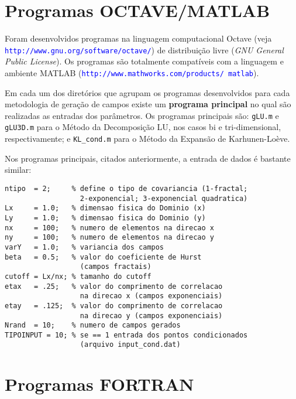 \documentclass[12pt,a4paper,portuges]{article}
\newcommand{\KL}{{Karhunen-Lo\`eve}}
\begin{document}
\section{Programas OCTAVE/MATLAB}

Foram desenvolvidos programas na linguagem computacional Octave (veja
\textcolor{blue}{\texttt{http://www.gnu.org/software/octave/}}) de distribuição livre ({\em GNU
General Public License}). Os programas são totalmente compatíveis com a linguagem e ambiente 
MATLAB (\textcolor{blue}{\texttt{http://www.mathworks.com/products/ matlab}}).%

Em cada um dos diretórios que agrupam os programas desenvolvidos para cada metodologia de geração
de campos existe um {\bf programa principal} no qual são realizadas as entradas dos parâmetros. Os
programas principais são: \texttt{gLU.m} e \texttt{gLU3D.m} para o Método da Decomposição LU, nos
casos bi e tri-dimensional, respectivamente; e \texttt{KL\_cond.m} para o Método da Expansão de
\KL. 

Nos programas principais, citados anteriormente, a entrada de dados é bastante similar:

\begin{verbatim}
ntipo  = 2;     % define o tipo de covariancia (1-fractal;
                  2-exponencial; 3-exponencial quadratica)
Lx     = 1.0;   % dimensao fisica do Dominio (x)
Ly     = 1.0;   % dimensao fisica do Dominio (y)
nx     = 100;   % numero de elementos na direcao x
ny     = 100;   % numero de elementos na direcao y
varY   = 1.0;   % variancia dos campos
beta   = 0.5;   % valor do coeficiente de Hurst
                  (campos fractais)
cutoff = Lx/nx; % tamanho do cutoff
etax   = .25;   % valor do comprimento de correlacao
                  na direcao x (campos exponenciais)
etay   = .125;  % valor do comprimento de correlacao
                  na direcao y (campos exponenciais)
Nrand  = 10;    % numero de campos gerados
TIPOINPUT = 10; % se == 1 entrada dos pontos condicionados
                  (arquivo input_cond.dat)
\end{verbatim}
\section{Programas FORTRAN}
\end{document}

